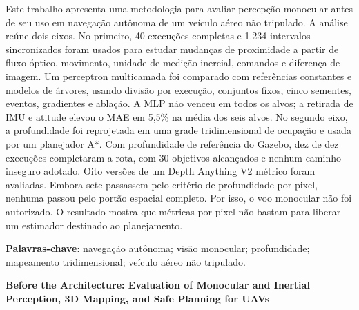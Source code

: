 
\setlength{\absparsep}{18pt}

\begin{resumo}
Este trabalho apresenta uma metodologia para avaliar percepção monocular antes de seu uso em navegação autônoma de um veículo aéreo não tripulado. A análise reúne dois eixos. No primeiro, 40 execuções completas e 1.234 intervalos sincronizados foram usados para estudar mudanças de proximidade a partir de fluxo óptico, movimento, unidade de medição inercial, comandos e diferença de imagem. Um perceptron multicamada foi comparado com referências constantes e modelos de árvores, usando divisão por execução, conjuntos fixos, cinco sementes, eventos, gradientes e ablação. A MLP não venceu em todos os alvos; a retirada de IMU e atitude elevou o MAE em 5,5\% na média dos seis alvos. No segundo eixo, a profundidade foi reprojetada em uma grade tridimensional de ocupação e usada por um planejador A*. Com profundidade de referência do Gazebo, dez de dez execuções completaram a rota, com 30 objetivos alcançados e nenhum caminho inseguro adotado. Oito versões de um Depth Anything V2 métrico foram avaliadas. Embora sete passassem pelo critério de profundidade por pixel, nenhuma passou pelo portão espacial completo. Por isso, o voo monocular não foi autorizado. O resultado mostra que métricas por pixel não bastam para liberar um estimador destinado ao planejamento.

\vspace{\onelineskip}

\noindent
\textbf{Palavras-chave}: navegação autônoma; visão monocular; profundidade; mapeamento tridimensional; veículo aéreo não tripulado.
\end{resumo}

\begin{center}
\textbf{Before the Architecture: Evaluation of Monocular and Inertial Perception, 3D Mapping, and Safe Planning for UAVs}
\end{center}

